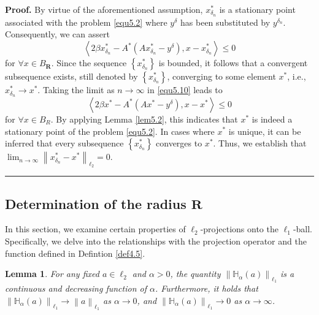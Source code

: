 \documentclass[a4paper,12pt]{article}
\newtheorem{lemma}[theorem]{Lemma}
\numberwithin{equation}{section}
\newenvironment{proof}[1][Proof]{\textbf{#1.} }
{\ \rule{0.75em}{0.75em}\smallskip}
\begin{document}
\begin{proof}
    By virtue of the aforementioned assumption, $x_{\delta_{n}}^{*}$ is a stationary point associated with the problem \eqref{equ5.2} where $y^{\delta}$ has been substituted by $y^{\delta_{n}}$. Consequently, we can assert
    \begin{equation}\label{equ5.10}
        \left<2\beta x_{\delta_{n}}^{*}-A^{*}\left(Ax_{\delta_{n}}^{*}-y^{\delta}\right), x-x_{\delta_{n}}^{*}\right>\leq 0
    \end{equation}
    for $\forall x\in B_{\mathbf{R}}$. Since the sequence $\left\{x_{\delta_{n}}^{*}\right\}$ is bounded, it follows that a convergent subsequence exists, still denoted by $\left\{x_{\delta_{n}}^{*}\right\}$, converging to some element $x^{*}$, i.e., $x_{\delta_{n}}^{*}\rightarrow x^{*}$. Taking the limit as $n\rightarrow\infty$ in \eqref{equ5.10} leads to
    \begin{equation}\label{equ5.11}
        \left<2\beta x^{*}-A^{*}\left(Ax^{*}-y^{\delta}\right), x-x^{*}\right>\leq 0
    \end{equation}
    for $\forall x\in B_{R}$. By applying Lemma \ref{lem5.2}, this indicates that $x^{*}$ is indeed a stationary point of the problem \eqref{equ5.2}. In cases where $x^{*}$ is unique, it can be inferred that every subsequence $\left\{x_{\delta_{n}}^{*}\right\}$ converges to $x^{*}$. Thus, we establish that $\lim_{n\rightarrow\infty}\left\|x_{\delta_{n}}^{*}-x^{*} \right\|_{\ell_{2}}=0$.
\end{proof}

\subsection{Determination of the radius $\mathbf{R}$}\label{sec5.2}

\par In this section, we examine certain properties of $\ell_{2}$-projections onto the $\ell_{1}$-ball. Specifically, we delve into the relationships with the projection operator and the function defined in Defintion \ref{def4.5}.

\begin{lemma}\label{lem5.10}
    For any fixed $a\in\ell_{2}$ and $\alpha>0$, the quantity $\left\|\mathbb{H}_{\alpha}\left(a\right)\right\|_{\ell_{1}}$ is a continuous and decreasing function of $\alpha$. Furthermore, it holds that $\left\|\mathbb{H}_{\alpha}\left(a\right)\right\|_{\ell_{1}}\rightarrow\left\|a\right\|_{\ell_{1}}$ as $\alpha\rightarrow 0$, and  $\left\|\mathbb{H}_{\alpha}\left(a\right)\right\|_{\ell_{1}}\rightarrow 0$ as $\alpha\rightarrow\infty$.
\end{lemma}
\end{document}
